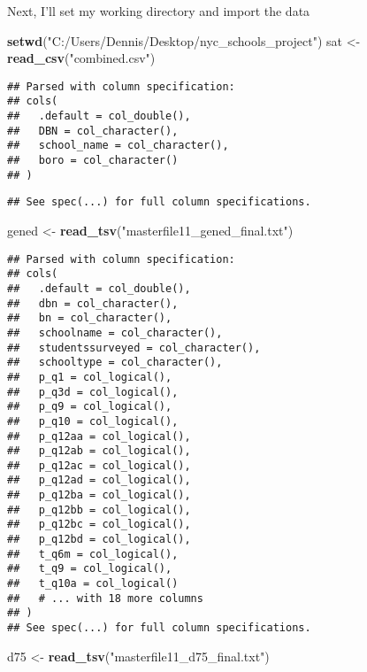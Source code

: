 \documentclass[]{article}
\newenvironment{Shaded}{\begin{snugshade}}{\end{snugshade}}
\newcommand{\KeywordTok}[1]{\textcolor[rgb]{0.13,0.29,0.53}{\textbf{#1}}}
\newcommand{\NormalTok}[1]{#1}
\newcommand{\StringTok}[1]{\textcolor[rgb]{0.31,0.60,0.02}{#1}}
\begin{document}
Next, I'll set my working directory and import the data

\begin{Shaded}
\begin{Highlighting}[]
\KeywordTok{setwd}\NormalTok{(}\StringTok{"C:/Users/Dennis/Desktop/nyc_schools_project"}\NormalTok{)}
\NormalTok{sat <-}\StringTok{ }\KeywordTok{read_csv}\NormalTok{(}\StringTok{"combined.csv"}\NormalTok{)}
\end{Highlighting}
\end{Shaded}

\begin{verbatim}
## Parsed with column specification:
## cols(
##   .default = col_double(),
##   DBN = col_character(),
##   school_name = col_character(),
##   boro = col_character()
## )
\end{verbatim}

\begin{verbatim}
## See spec(...) for full column specifications.
\end{verbatim}

\begin{Shaded}
\begin{Highlighting}[]
\NormalTok{gened <-}\StringTok{ }\KeywordTok{read_tsv}\NormalTok{(}\StringTok{"masterfile11_gened_final.txt"}\NormalTok{)}
\end{Highlighting}
\end{Shaded}

\begin{verbatim}
## Parsed with column specification:
## cols(
##   .default = col_double(),
##   dbn = col_character(),
##   bn = col_character(),
##   schoolname = col_character(),
##   studentssurveyed = col_character(),
##   schooltype = col_character(),
##   p_q1 = col_logical(),
##   p_q3d = col_logical(),
##   p_q9 = col_logical(),
##   p_q10 = col_logical(),
##   p_q12aa = col_logical(),
##   p_q12ab = col_logical(),
##   p_q12ac = col_logical(),
##   p_q12ad = col_logical(),
##   p_q12ba = col_logical(),
##   p_q12bb = col_logical(),
##   p_q12bc = col_logical(),
##   p_q12bd = col_logical(),
##   t_q6m = col_logical(),
##   t_q9 = col_logical(),
##   t_q10a = col_logical()
##   # ... with 18 more columns
## )
## See spec(...) for full column specifications.
\end{verbatim}

\begin{Shaded}
\begin{Highlighting}[]
\NormalTok{d75 <-}\StringTok{ }\KeywordTok{read_tsv}\NormalTok{(}\StringTok{"masterfile11_d75_final.txt"}\NormalTok{)}
\end{Highlighting}
\end{Shaded}
\end{document}
